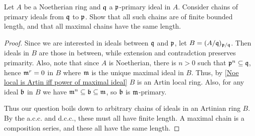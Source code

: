 \begin{exercise}
Let $A$ be a Noetherian ring and $\mathfrak{q}$ a $\mathfrak{p}$-primary ideal in $A$. Consider chains of primary ideals from $\mathfrak{q}$ to $\mathfrak{p}$. Show that all such chains are of finite bounded length, and that all maximal chains have the same length.
\end{exercise}
\begin{proof}
Since we are interested in ideals between $\mathfrak{q}$ and $\mathfrak{p}$, let $B=(A/\mathfrak{q})_{\mathfrak{p}/\mathfrak{q}}$. Then ideals in $B$ are those in between, while extension and contradction preserves primarity. Also, note that since $A$ is Noetherian, there is $n>0$ such that $\mathfrak{p}^n\subseteq\mathfrak{q}$, hence $\mathfrak{m}^r=0$ in $B$ where $\mathfrak{m}$ is the unique maximal ideal in $B$. Thus, by \cref{Noe local is Artin iff power of maximal ideal} $B$ is an Artin local ring. Also, for any ideal $\mathfrak{b}$ in $B$ we have $\mathfrak{m}^n\subseteq \mathfrak{b}\subseteq \mathfrak{m}$, so $\mathfrak{b}$ is $\mathfrak{m}$-primary.\par
Thus our question boils down to arbitrary chains of ideals in an Artinian ring $B$. By the a.c.c. and d.c.c., these must all have finite length. A maximal chain is a composition series, and these all have the same length.
\end{proof}
